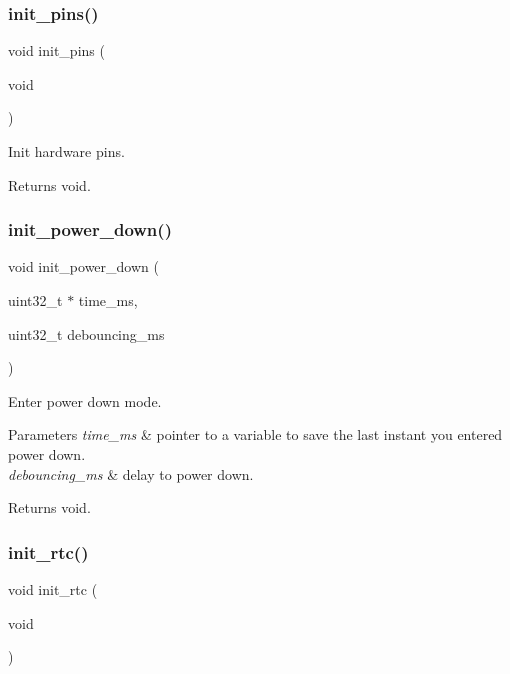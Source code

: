 \subsubsection{\texorpdfstring{init\+\_\+pins()}{init\_pins()}}
{\footnotesize\ttfamily void init\+\_\+pins (\begin{DoxyParamCaption}\item[{void}]{ }\end{DoxyParamCaption})}



Init hardware pins. 

\begin{DoxyReturn}{Returns}
void. 
\end{DoxyReturn}
\mbox{\label{i2c-rain_8ino_afb98a0f07c30784284f48271ffe02b97}} 
\subsubsection{\texorpdfstring{init\+\_\+power\+\_\+down()}{init\_power\_down()}}
{\footnotesize\ttfamily void init\+\_\+power\+\_\+down (\begin{DoxyParamCaption}\item[{uint32\+\_\+t $\ast$}]{time\+\_\+ms,  }\item[{uint32\+\_\+t}]{debouncing\+\_\+ms }\end{DoxyParamCaption})}



Enter power down mode. 


\begin{DoxyParams}{Parameters}
{\em time\+\_\+ms} & pointer to a variable to save the last instant you entered power down. \\
\hline
{\em debouncing\+\_\+ms} & delay to power down. \\
\hline
\end{DoxyParams}
\begin{DoxyReturn}{Returns}
void. 
\end{DoxyReturn}
\mbox{\label{i2c-rain_8ino_ab985cc69f5f573113405b4f118c96d33}} 
\subsubsection{\texorpdfstring{init\+\_\+rtc()}{init\_rtc()}}
{\footnotesize\ttfamily void init\+\_\+rtc (\begin{DoxyParamCaption}\item[{void}]{ }\end{DoxyParamCaption})}



